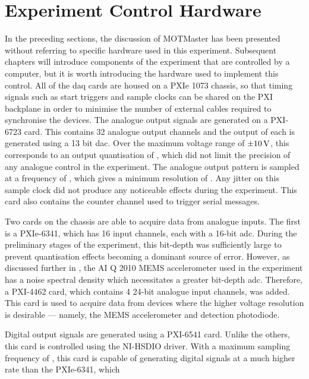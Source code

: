 \section{Experiment Control Hardware}
In the preceding sections, the discussion of MOTMaster has been presented
without referring to specific hardware used in this experiment. Subsequent
chapters will introduce components of the experiment that are controlled by a
computer, but it is worth introducing the hardware used to implement this
control. All of the \ac{daq} cards are housed on a PXIe 1073 chassis, so that
timing signals such as start triggers and sample clocks can be shared on the
PXI backplane in order to minimise the number of external cables required to
synchronise the devices. The analogue output signals are generated on a
PXI-6723 card. This contains 32 analogue output channels and the output of
each is generated using a 13 bit \ac{dac}. Over the maximum voltage range of
\(\pm \sivalue{10}{\volt}\), this corresponds to an output quantisation of
, which did not limit the precision of any
analogue control in the experiment. The analogue output pattern is sampled at
a frequency of , which gives a minimum resolution
of . Any jitter on this sample clock did not
produce any noticeable effects during the experiment. This card also contains
the counter channel used to trigger serial messages. \par\noindent
Two cards on the chassis are able to acquire data from analogue inputs. The
first is a PXIe-6341, which has 16 input channels, each with a 16-bit
\ac{adc}. During the preliminary stages of the experiment, this bit-depth was
sufficiently large to prevent quantisation effects becoming a dominant source
of error. However, as discussed further in ,
the AI Q 2010 MEMS accelerometer used in the experiment has a noise spectral
density which necessitates a greater bit-depth \ac{adc}. Therefore, a
PXI-4462 card, which contains 4 24-bit analogue input channels, was added.
This card is used to acquire data from devices where the higher voltage
resolution is desirable --- namely, the MEMS accelerometer and detection
photodiode.\par\noindent
Digital output signals are generated using a PXI-6541 card. Unlike the
others, this card is controlled using the NI-HSDIO driver. With a maximum
sampling frequency of , this card is capable of
generating digital signals at a much higher rate than the PXIe-6341, which
